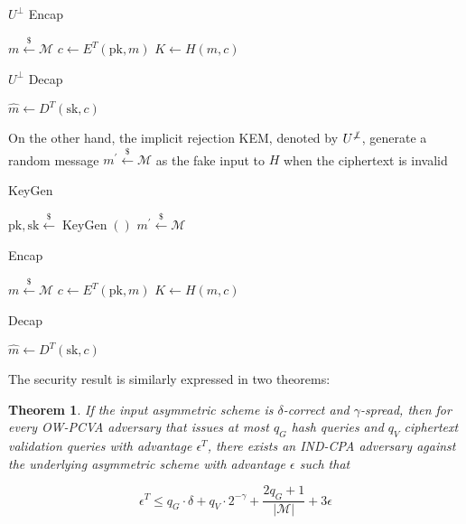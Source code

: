 \documentclass{article}
\newcommand{\norm}[1]{\vert {#1} \vert}
\newcommand{\leftsample}{\overset{{\scriptscriptstyle\$}}{\leftarrow}}
\newtheorem{theorem}{Theorem}[section]
\begin{document}
\begin{multicols}{2}
    \begin{algorithm}[H]
        \SetAlgoLined
        \caption{$U^\bot$ Encap}
        $m \leftsample \mathcal{M}$\;
        $c \leftarrow E^T(\text{pk}, m)$\;
        $K \leftarrow H(m, c)$ \;
    \end{algorithm}
    \columnbreak

    \begin{algorithm}[H]
        \SetAlgoLined
        \caption{$U^\bot$ Decap}
        $\hat{m} \leftarrow D^T(\text{sk}, c)$\;
    \end{algorithm}
\end{multicols}

On the other hand, the implicit rejection KEM, denoted by $U^{\not\bot}$, generate a random message $m^\prime \leftsample \mathcal{M}$ as the fake input to $H$ when the ciphertext is invalid

\begin{multicols}{3}
    \begin{algorithm}[H]
        \SetAlgoLined
        \caption{KeyGen}
        $\text{pk}, \text{sk} \leftsample \operatorname{KeyGen}()$\;
        $m^\prime \leftsample \mathcal{M}$\;
        \;
    \end{algorithm}
    \columnbreak

    \begin{algorithm}[H]
        \SetAlgoLined
        \caption{Encap}
        $m \leftsample \mathcal{M}$\;
        $c \leftarrow E^T(\text{pk}, m)$\;
        $K \leftarrow H(m, c)$\;
    \end{algorithm}
    \columnbreak

    \begin{algorithm}[H]
        \SetAlgoLined
        \caption{Decap}
        $\hat{m} \leftarrow D^T(\text{sk}, c)$\;
    \end{algorithm}
\end{multicols}

The security result is similarly expressed in two theorems:

\begin{theorem}
    If the input asymmetric scheme is $\delta$-correct and $\gamma$-spread, then for every OW-PCVA adversary that issues at most $q_G$ hash queries and $q_V$ ciphertext validation queries with advantage $\epsilon^T$, there exists an IND-CPA adversary against the underlying asymmetric scheme with advantage $\epsilon$ such that

    \begin{equation*}
        \epsilon^T \leq q_G \cdot \delta + q_V \cdot 2^{-\gamma} 
            + \frac{2q_G + 1}{\norm{\mathcal{M}}}
            + 3\epsilon
    \end{equation*}
\end{theorem}
\end{document}
